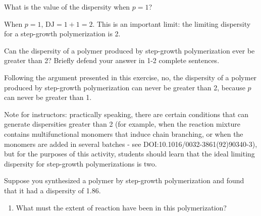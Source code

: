 \begin{activity}
\begin{ctqs}
\begin{solution}[1.5in]
			\end{solution}
			
			
		\question What is the value of the dispersity when $p=1$?
		
			\begin{solution}[1in]
			
				When $p=1$, $\text{DJ}=1+1=2$.  This is an important limit: the limiting dispersity for a step-growth polymerization is 2.
			
			\end{solution}
			
			
			
		\question Can the dispersity of a polymer produced by step-growth polymerization ever be greater than 2?  Briefly defend your answer in 1-2 complete sentences.
		
			\begin{solution}[1.5in]
			
				Following the argument presented in this exercise, no, the dispersity of a polymer produced by step-growth polymerization can never be greater than 2, because $p$ can never be greater than 1. 
				
				Note for instructors: practically speaking, there are certain conditions that can generate dispersities greater than 2 (for example, when the reaction mixture contains multifunctional monomers that induce chain branching, or when the monomers are added in several batches - see DOI:10.1016/0032-3861(92)90340-3), but for the purposes of this activity, students should learn that the ideal limiting dispersity for step-growth polymerizations is two.
			
			\end{solution}
			
			
\end{ctqs}

\begin{exercises}

		\exercise Suppose you synthesized a polymer by step-growth polymerization and found that it had a dispersity of 1.86.
		
			\begin{enumerate}
				\item What must the extent of reaction have been in this polymerization?
		
					\begin{solution}
					\end{solution}
					

\end{enumerate}
\end{exercises}
\end{activity}
